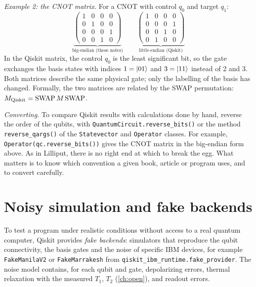 \emph{Example 2: the CNOT matrix.} For a CNOT with control $q_0$ and target $q_1$:
\begin{equation}
  \underbrace{\begin{pmatrix}1&0&0&0\\0&1&0&0\\0&0&0&1\\0&0&1&0\end{pmatrix}}_{\text{big-endian (these notes)}}\qquad
  \underbrace{\begin{pmatrix}1&0&0&0\\0&0&0&1\\0&0&1&0\\0&1&0&0\end{pmatrix}}_{\text{little-endian (Qiskit)}}
\end{equation}
In the Qiskit matrix, the control $q_0$ is the least significant bit, so the gate exchanges the basis states with indices $1=\left|01\right\rangle$ and $3=\left|11\right\rangle$ instead of 2 and 3. Both matrices describe
the same physical gate; only the labelling of the basis has changed. Formally, the two matrices are related by the SWAP permutation: $M_{\rm Qiskit}=\mathrm{SWAP}\,M\,\mathrm{SWAP}$.

\emph{Converting.} To compare Qiskit results with calculations done by hand, reverse the order of the qubits, with \texttt{QuantumCircuit.reverse\_bits()} or the method \texttt{reverse\_qargs()} of
the \texttt{Statevector} and \texttt{Operator} classes. For example, \texttt{Operator(qc.reverse\_bits())} gives the CNOT matrix in the big-endian form above. As in Lilliput, there is no right end
at which to break the egg. What matters is to know which convention a given book, article or program uses, and to convert carefully.

\section{Noisy simulation and fake backends}
To test a program under realistic conditions without access to a real quantum computer, Qiskit provides \emph{fake backends}: simulators that reproduce the qubit connectivity, the basis gates and the
noise of specific IBM devices, for example \texttt{FakeManilaV2} or \texttt{FakeMarrakesh} from \texttt{qiskit\_ibm\_runtime.fake\_provider}. The noise model contains, for each qubit and gate,
depolarizing errors, thermal relaxation with the measured $T_1$, $T_2$ (\cref{ch:open}), and readout errors.

